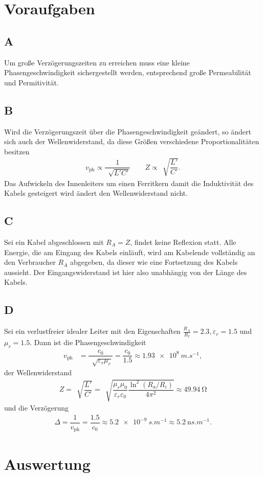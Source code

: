 \documentclass[a4paper,12pt]{article}
\numberwithin{equation}{section}
\begin{document}
\newpage
\section{Voraufgaben}
\subsection{A}
Um große Verzögerungszeiten zu erreichen muss eine kleine Phasengeschwindigkeit sichergestellt werden, entsprechend große Permeabilität und Permitivität.

\subsection{B}
Wird die Verzögerungszeit über die Phasengeschwindigkeit geändert, so ändert sich auch der Wellenwiderstand, da diese Größen verschiedene Proportionalitäten besitzen
\begin{align} 
        v_{\text{ph}}\propto \dfrac{1}{\,\sqrt[]{L'C'}}\qquad Z\propto \,\sqrt[]{\dfrac{L'}{C'}}
.\end{align} 
Das Aufwickeln des Innenleiters um einen Ferritkern damit die Induktivität des Kabels gesteigert wird ändert den Wellenwiderstand nicht.

\subsection{C}
Sei ein Kabel abgeschlossen mit $R_A=Z$, findet keine Reflexion statt.
Alle Energie, die am Eingang des Kabels einläuft, wird am Kabelende vollständig an den Verbraucher $R_A$ abgegeben, da dieser wie eine Fortsetzung des Kabels aussieht.
Der Eingangswiderstand ist hier also unabhängig von der Länge des Kabels.

\subsection{D}
Sei ein verlustfreier idealer Leiter mit den Eigenschaften $\tfrac{R_A}{R_I}=2.3,\varepsilon _r=1.5$ und $\mu _r=1.5$.
Dann ist die Phasengeschwindigkeit
\begin{align} 
        v_{\text{ph}}&=\dfrac{c_0}{\,\sqrt[]{\varepsilon _r\mu _r}}=\dfrac{c_0}{1.5}\approx \SI{1.93e+8}{m.s ^{-1}}
,\end{align} 
der Wellenwiderstand
\begin{align} 
        Z=\,\sqrt[]{\dfrac{L'}{C'}}=\,\sqrt[]{\dfrac{\mu _r\mu _0}{\varepsilon _r\varepsilon _0}\dfrac{\ln^2\left(R_a/R_i\right)}{4\pi ^2}}\approx \SI{49.94}{\ohm}
\end{align} 
und die Verzögerung
\begin{align} 
        \Delta =\dfrac{1}{v_{\text{ph} }}=\dfrac{1.5}{c_0}\approx \SI{5.2e-9}{s.m ^{-1}}\approx \SI{5.2}{\nano s.m ^{-1}}
.\end{align} 


\newpage
\section{Auswertung}

\clearpage
\listoffigures
\listoftables



\end{document}
